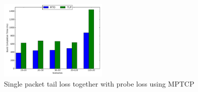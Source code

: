 \documentclass[10pt,conference,compsoc]{IEEEtran}
\begin{document}
\begin{figure}[!ht]
\begin{center}
\includegraphics[angle=0, width=0.46\textwidth, natwidth=578.16,natheight=433.62]{plots/1PP.pdf}
\caption{Single packet tail loss together with probe loss using MPTCP}\label{1pp}
\end{center}
\end{figure}










\end{document}
